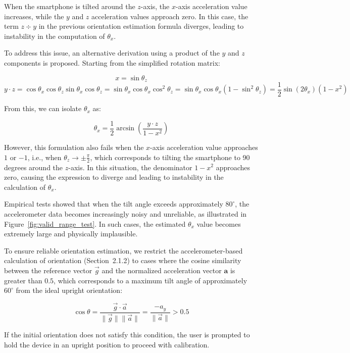 \documentclass{article}
\begin{document}
    When the smartphone is tilted around the $z$-axis, the $x$-axis acceleration
    value increases, while the $y$ and $z$ acceleration values approach zero. In
    this case, the term $z \div y$ in the previous orientation estimation
    formula diverges, leading to instability in the computation of $\theta_{x}$.

    To address this issue, an alternative derivation using a product of the $y$
    and $z$ components is proposed. Starting from the simplified rotation matrix:

    \[
        x = \sin\theta_{z}
    \]
    \[
        y \cdot z = \cos\theta_{x}\cos\theta_{z}\sin\theta_{x}\cos\theta_{z}= \sin
        \theta_{x}\cos\theta_{x}\cos^{2}\theta_{z}= \sin\theta_{x}\cos\theta_{x}(
        1 - \sin^{2}\theta_{z}) = \frac{1}{2}\sin(2\theta_{x}) (1 - x^{2})
    \]

    From this, we can isolate $\theta_{x}$ as:

    \[
        \theta_{x}= \frac{1}{2}\arcsin\left(\frac{y \cdot z}{1 - x^{2}}\right)
    \]

    However, this formulation also fails when the $x$-axis acceleration value approaches
    $1$ or $-1$, i.e., when $\theta_{z}\rightarrow \pm \frac{\pi}{2}$, which corresponds
    to tilting the smartphone to 90 degrees around the $z$-axis. In this
    situation, the denominator $1 - x^{2}$ approaches zero, causing the
    expression to diverge and leading to instability in the calculation of
    $\theta_{x}$.

    Empirical tests showed that when the tilt angle exceeds approximately
    $80^{\circ}$, the accelerometer data becomes increasingly noisy and unreliable,
    as illustrated in Figure~\ref{fig:valid_range_test}. In such cases, the
    estimated $\theta_{x}$ value becomes extremely large and physically
    implausible.

    To ensure reliable orientation estimation, we restrict the accelerometer-based
    calculation of orientation (Section~2.1.2) to cases where the cosine
    similarity between the reference vector $\vec{g}$ and the normalized
    acceleration vector $\mathbf{a}$ is greater than $0.5$, which corresponds to
    a maximum tilt angle of approximately $60^{\circ}$ from the ideal upright orientation:

    \[
        \cos\theta = \frac{ \vec{g} \cdot \vec{a}}{\| \vec{g}\| \|\vec{a}\|}= \frac{-a_{y}}{\|\vec{a}\|}
        > 0.5
    \]

    If the initial orientation does not satisfy this condition, the user is prompted
    to hold the device in an upright position to proceed with calibration.
\end{document}
